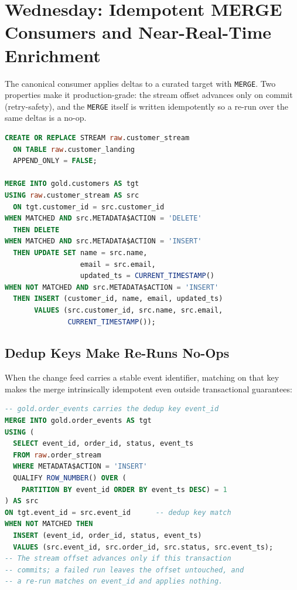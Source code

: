 \section{Wednesday: Idempotent MERGE Consumers and Near-Real-Time Enrichment}
The canonical consumer applies deltas to a curated target with \texttt{MERGE}. Two properties make it production-grade: the stream offset advances only on commit (retry-safety), and the \texttt{MERGE} itself is written idempotently so a re-run over the same deltas is a no-op.

\begin{lstlisting}[language=SQL, caption={Stream + MERGE CDC pattern}]
CREATE OR REPLACE STREAM raw.customer_stream
  ON TABLE raw.customer_landing
  APPEND_ONLY = FALSE;

MERGE INTO gold.customers AS tgt
USING raw.customer_stream AS src
  ON tgt.customer_id = src.customer_id
WHEN MATCHED AND src.METADATA$ACTION = 'DELETE'
  THEN DELETE
WHEN MATCHED AND src.METADATA$ACTION = 'INSERT'
  THEN UPDATE SET name = src.name,
                  email = src.email,
                  updated_ts = CURRENT_TIMESTAMP()
WHEN NOT MATCHED AND src.METADATA$ACTION = 'INSERT'
  THEN INSERT (customer_id, name, email, updated_ts)
       VALUES (src.customer_id, src.name, src.email,
               CURRENT_TIMESTAMP());
\end{lstlisting}

\subsection{Dedup Keys Make Re-Runs No-Ops}
When the change feed carries a stable event identifier, matching on that key makes the merge intrinsically idempotent even outside transactional guarantees:

\begin{lstlisting}[language=SQL, caption={Idempotent stream MERGE with a dedup key}]
-- gold.order_events carries the dedup key event_id
MERGE INTO gold.order_events AS tgt
USING (
  SELECT event_id, order_id, status, event_ts
  FROM raw.order_stream
  WHERE METADATA$ACTION = 'INSERT'
  QUALIFY ROW_NUMBER() OVER (
    PARTITION BY event_id ORDER BY event_ts DESC) = 1
) AS src
ON tgt.event_id = src.event_id      -- dedup key match
WHEN NOT MATCHED THEN
  INSERT (event_id, order_id, status, event_ts)
  VALUES (src.event_id, src.order_id, src.status, src.event_ts);
-- The stream offset advances only if this transaction
-- commits; a failed run leaves the offset untouched, and
-- a re-run matches on event_id and applies nothing.
\end{lstlisting}

